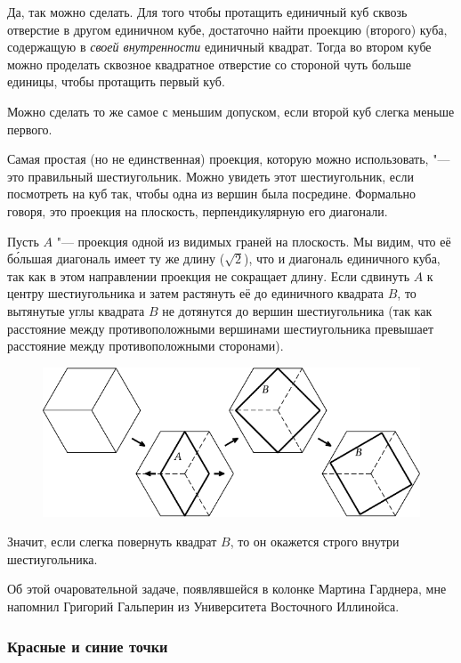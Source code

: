 \documentclass[twoside]{book}
\begin{document}
Да, так можно сделать.
Для того чтобы протащить единичный куб сквозь отверстие в другом единичном кубе, достаточно найти проекцию (второго) куба, содержащую в \emph{своей внутренности} единичный квадрат.
Тогда во втором кубе можно проделать сквозное квадратное отверстие %
со стороной чуть больше единицы, чтобы протащить первый куб.

Можно сделать то же самое с меньшим допуском, если второй куб слегка меньше первого.

Самая простая (но не единственная) проекция, которую можно использовать, "--- это правильный шестиугольник.
Можно увидеть этот шестиугольник, если посмотреть на куб так, чтобы одна из вершин была посредине.
Формально говоря, это проекция на плоскость, перпендикулярную его диагонали. %

Пусть $A$ "--- проекция одной из видимых граней на плоскость.
Мы видим, что её б\'{о}льшая диагональ имеет ту же длину ($\sqrt{2}$), что и диагональ единичного куба, так как в этом направлении проекция не сокращает длину.
Если сдвинуть $A$ к центру шестиугольника и затем растянуть её до единичного квадрата $B$, то вытянутые углы квадрата $B$ не дотянутся до вершин шестиугольника (так как расстояние между противоположными вершинами шестиугольника превышает расстояние между противоположными сторонами).

\begin{figure}[!ht]
\centering
\includegraphics{mp/wink-11}
\end{figure}

Значит, если слегка повернуть квадрат $B$, то он окажется строго внутри шестиугольника.\heart

Об этой очаровательной задаче, появлявшейся в колонке Мартина Гарднера, мне напомнил Григорий Гальперин из Университета Восточного Иллинойса.

\subsubsection*{Красные и синие точки}%
\end{document}
